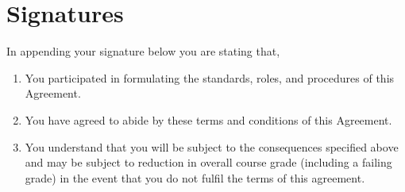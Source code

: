 \documentclass{article}
\begin{document}
\newpage
\section{Signatures}
In appending your signature below you are stating that,
\begin{enumerate}
    \item You participated in formulating the standards, roles, and procedures of this Agreement.
    \item You have agreed to abide by these terms and conditions of this Agreement.
    \item You understand that you will be subject to the consequences specified above and may be subject to reduction in overall course grade (including a failing grade) in the event that you do not fulfil the terms of this agreement.
\end{enumerate}
\end{document}
